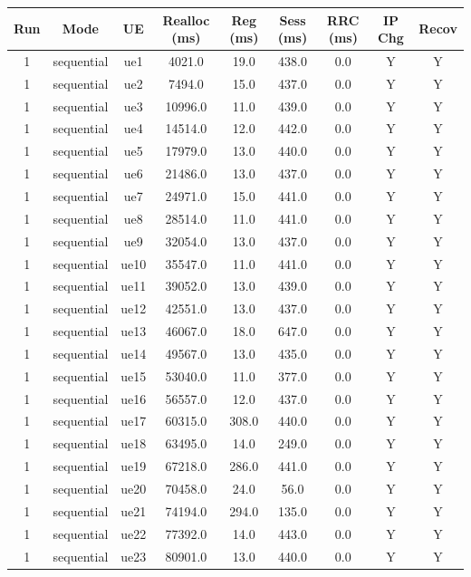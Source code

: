 \begin{table}[ht]
\centering
\begin{tabular}{|c|c|c|c|c|c|c|c|c|}
\hline
Run & Mode & UE & Realloc (ms) & Reg (ms) & Sess (ms) & RRC (ms) & IP Chg & Recov \\
\hline
1 & sequential & ue1 & 4021.0 & 19.0 & 438.0 & 0.0 & Y & Y \\
1 & sequential & ue2 & 7494.0 & 15.0 & 437.0 & 0.0 & Y & Y \\
1 & sequential & ue3 & 10996.0 & 11.0 & 439.0 & 0.0 & Y & Y \\
1 & sequential & ue4 & 14514.0 & 12.0 & 442.0 & 0.0 & Y & Y \\
1 & sequential & ue5 & 17979.0 & 13.0 & 440.0 & 0.0 & Y & Y \\
1 & sequential & ue6 & 21486.0 & 13.0 & 437.0 & 0.0 & Y & Y \\
1 & sequential & ue7 & 24971.0 & 15.0 & 441.0 & 0.0 & Y & Y \\
1 & sequential & ue8 & 28514.0 & 11.0 & 441.0 & 0.0 & Y & Y \\
1 & sequential & ue9 & 32054.0 & 13.0 & 437.0 & 0.0 & Y & Y \\
1 & sequential & ue10 & 35547.0 & 11.0 & 441.0 & 0.0 & Y & Y \\
1 & sequential & ue11 & 39052.0 & 13.0 & 439.0 & 0.0 & Y & Y \\
1 & sequential & ue12 & 42551.0 & 13.0 & 437.0 & 0.0 & Y & Y \\
1 & sequential & ue13 & 46067.0 & 18.0 & 647.0 & 0.0 & Y & Y \\
1 & sequential & ue14 & 49567.0 & 13.0 & 435.0 & 0.0 & Y & Y \\
1 & sequential & ue15 & 53040.0 & 11.0 & 377.0 & 0.0 & Y & Y \\
1 & sequential & ue16 & 56557.0 & 12.0 & 437.0 & 0.0 & Y & Y \\
1 & sequential & ue17 & 60315.0 & 308.0 & 440.0 & 0.0 & Y & Y \\
1 & sequential & ue18 & 63495.0 & 14.0 & 249.0 & 0.0 & Y & Y \\
1 & sequential & ue19 & 67218.0 & 286.0 & 441.0 & 0.0 & Y & Y \\
1 & sequential & ue20 & 70458.0 & 24.0 & 56.0 & 0.0 & Y & Y \\
1 & sequential & ue21 & 74194.0 & 294.0 & 135.0 & 0.0 & Y & Y \\
1 & sequential & ue22 & 77392.0 & 14.0 & 443.0 & 0.0 & Y & Y \\
1 & sequential & ue23 & 80901.0 & 13.0 & 440.0 & 0.0 & Y & Y \\

\end{tabular}
\end{table}
